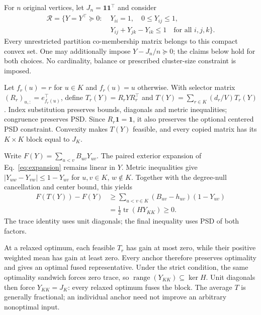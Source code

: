 \documentclass[sigconf,anonymous,review]{acmart}
\newcommand{\1}{\mathbf{1}}
\begin{document}
For $n$ original vertices, let $J_n=\1\1^\top$ and consider
\begin{align*}
\mathcal R=\{Y=Y^\top\succeq0:\;&Y_{ii}=1,\quad 0\le Y_{ij}\le1,\\
 &Y_{ij}+Y_{jk}-Y_{ik}\le1\quad\text{for all }i,j,k\}.
\end{align*}
Every unrestricted partition co-membership matrix belongs to this compact
convex set. One may additionally impose $Y-J_n/n\succeq0$; the claims below
hold for both choices. No cardinality, balance or prescribed cluster-size
constraint is imposed.

Let $f_r(u)=r$ for $u\in K$ and $f_r(u)=u$ otherwise. With selector matrix
$(R_r)_{u,:}=e_{f_r(u)}^\top$, define
$T_r(Y)=R_rYR_r^\top$ and
$T(Y)=\sum_{r\in K}(d_r/V)T_r(Y)$.
Index substitution preserves bounds, diagonals and metric inequalities;
congruence preserves PSD. Since $R_r\1=\1$, it also preserves the optional
centered PSD constraint. Convexity makes $T(Y)$ feasible, and every copied
matrix has its $K\times K$ block equal to $J_K$.

Write $F(Y)=\sum_{u<v}B_{uv}Y_{uv}$. The paired exterior expansion of
Eq.~\eqref{eq:expansion} remains linear in $Y$. Metric inequalities give
$|Y_{uw}-Y_{vw}|\le1-Y_{uv}$ for $u,v\in K$, $w\notin K$.
Together with the degree-null cancellation and center bound, this yields
\begin{align*}
F(T(Y))-F(Y)
 &\ge\sum_{u<v\in K}(B_{uv}-h_{uv})(1-Y_{uv})\\
 &=\tfrac12\operatorname{tr}(H Y_{KK})\ge0.
\end{align*}
The trace identity uses unit diagonals; the final inequality uses PSD of
both factors.

At a relaxed optimum, each feasible $T_r$ has gain at most zero, while their
positive weighted mean has gain at least zero. Every anchor therefore
preserves optimality and gives an optimal fused representative. Under the
strict condition, the same optimality sandwich forces zero trace, so
$\operatorname{range}(Y_{KK})\subseteq\ker H$.
Unit diagonals then force $Y_{KK}=J_K$: every relaxed optimum fuses the block.
The average $T$ is generally fractional; an individual anchor need not
improve an arbitrary nonoptimal input.
\end{document}
